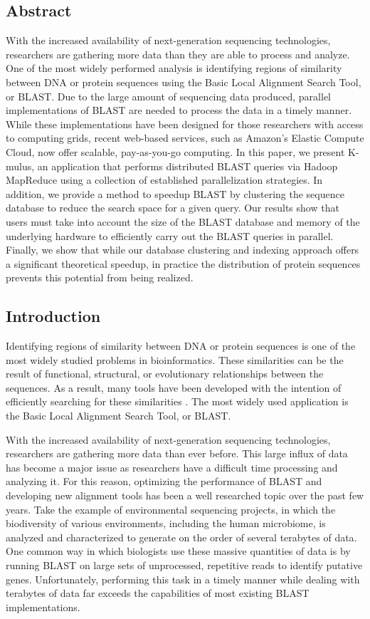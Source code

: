 \documentclass[12pt,\mydriver]{thesis}
\begin{document}
\subsection{Abstract}
With the increased availability of next-generation sequencing technologies, researchers are gathering more data than they are able to process and analyze. One of the most widely performed analysis is identifying regions of similarity between DNA or protein sequences using the Basic Local Alignment Search Tool, or BLAST. Due to the large amount of sequencing data produced, parallel implementations of BLAST are needed to process the data in a timely manner.  While these implementations have been designed for those researchers with access to computing grids, recent web-based services, such as Amazon's Elastic Compute Cloud, now offer scalable, pay-as-you-go computing.  In this paper, we present K-mulus, an application that performs distributed BLAST queries via Hadoop MapReduce using a collection of established parallelization strategies. In addition, we provide a method to speedup BLAST by clustering the sequence database to reduce the search space for a given query.  Our results show that users must take into account the size of the BLAST database and memory of the underlying hardware to efficiently carry out the BLAST queries in parallel.  Finally, we show that while our database clustering and indexing approach offers a significant theoretical speedup, in practice the distribution of protein sequences prevents this potential from being realized.

\subsection{Introduction}
Identifying regions of similarity between DNA or protein sequences is one of the most widely studied problems in bioinformatics. These similarities can be the result of functional, structural, or evolutionary relationships between the sequences. As a result, many tools have been developed with the intention of efficiently searching for these similarities \cite{altschul1990basic,eddy2009new,kent2002blat}. The most widely used application is the Basic Local Alignment Search Tool, or BLAST\cite{altschul1990basic}.

With the increased availability of next-generation sequencing technologies, researchers are gathering more data than ever before. This large influx of data has become a major issue as researchers have a difficult time processing and analyzing it. For this reason, optimizing the performance of BLAST and developing new alignment tools has been a well researched topic over the past few years. Take the example of environmental sequencing projects, in which the biodiversity of various environments, including the human microbiome, is analyzed and characterized to generate on the order of several terabytes of data\cite{peterson2009nih}. One common way in which biologists use these massive quantities of data is by running BLAST on large sets of unprocessed, repetitive reads to identify putative genes\cite{li2010est,murray2002identification}. Unfortunately, performing this task in a timely manner while dealing with terabytes of data far exceeds the capabilities of most existing BLAST implementations.
\end{document}
